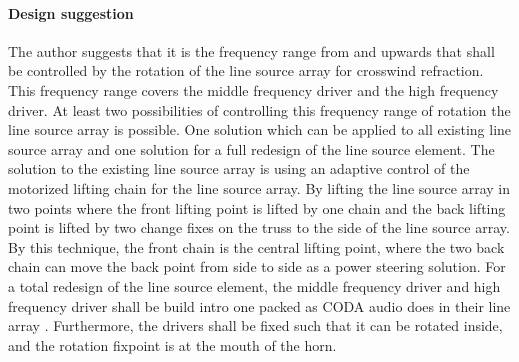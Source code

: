 \paragraph{Design suggestion} 
The author suggests that it is the frequency range from  and upwards that shall be controlled by the rotation of the line source array for crosswind refraction. This frequency range covers the middle frequency driver and the high frequency driver. At least two possibilities of controlling this frequency range of rotation the line source array is possible. One solution which can be applied to all existing line source array and one solution for a full redesign of the line source element. The solution to the existing line source array is using an adaptive control of the motorized lifting chain for the line source array. By lifting the line source array in two points where the front lifting point is lifted by one chain and the back lifting point is lifted by two change fixes on the truss to the side of the line source array. By this technique, the front chain is the central lifting point, where the two back chain can move the back point from side to side as a power steering solution. For a total redesign of the line source element, the middle frequency driver and high frequency driver shall be build intro one packed as CODA audio does in their line array \citep{coda_ddp}. Furthermore, the drivers shall be fixed such that it can be rotated inside, and the rotation fixpoint is at the mouth of the horn.   




